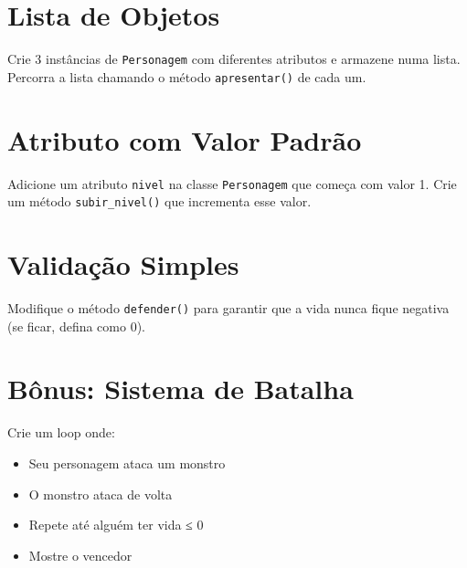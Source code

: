 \section{Lista de Objetos}
Crie 3 instâncias de \texttt{Personagem} com diferentes atributos e armazene numa lista. Percorra a lista chamando o método \texttt{apresentar()} de cada um.

\section{Atributo com Valor Padrão}
Adicione um atributo \texttt{nivel} na classe \texttt{Personagem} que começa com valor 1. Crie um método \texttt{subir\_nivel()} que incrementa esse valor.

\section{Validação Simples}
Modifique o método \texttt{defender()} para garantir que a vida nunca fique negativa (se ficar, defina como 0).

\section{Bônus: Sistema de Batalha}
Crie um loop onde:
\begin{itemize}
\item Seu personagem ataca um monstro
\item O monstro ataca de volta
\item Repete até alguém ter vida ≤ 0
\item Mostre o vencedor
\end{itemize}

